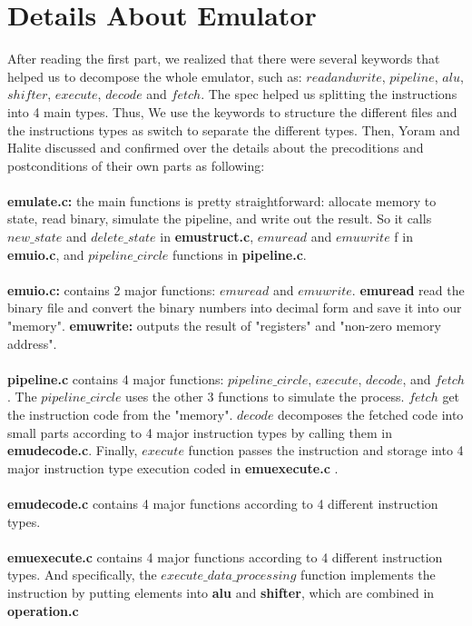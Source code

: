 \documentclass[a4paper]{article}
\begin{document}
\section{Details About Emulator}
After reading the first part, we realized that there were several keywords that helped us to decompose the whole emulator, such as: $read and write$, $pipeline$, $alu$, $shifter$, $execute$, $decode$ and $fetch$. The spec helped us splitting the instructions into 4 main types. Thus, We use the keywords to structure the different files and the instructions types as switch to separate the different types. Then, Yoram and Halite discussed and confirmed over the details about the precoditions and postconditions of their own parts as following:
\\\\
\textbf{emulate.c:} the main functions is pretty straightforward: allocate memory to state, read binary, simulate the pipeline, and write out the result. So it calls $new\_state$ and $delete\_state$ in \textbf{emustruct.c}, $emuread$ and $emuwrite$ f in \textbf{emuio.c}, and $pipeline\_circle$ functions in \textbf{pipeline.c}.
\\\\
\textbf{emuio.c:} contains 2 major functions: $emuread$ and $emuwrite$. \textbf{emuread} read the binary file and convert the binary numbers into decimal form and save it into our "memory".
\textbf{emuwrite:} outputs the result of "registers" and "non-zero memory address".
\\\\
\textbf{pipeline.c} contains 4 major functions: $pipeline\_circle$, $execute$, $decode$, and $fetch$. The $pipeline\_circle$ uses the other 3 functions to simulate the process. $fetch$ get the instruction code from the "memory". $decode$ decomposes the fetched code into small parts according to 4 major instruction types by calling them in \textbf{emudecode.c}. Finally, $execute$ function passes the instruction and storage into 4 major instruction type execution coded in \textbf{emuexecute.c} .
\\\\
\textbf{emudecode.c} contains 4 major functions according to 4 different instruction types.
\\\\
\textbf{emuexecute.c} contains 4 major functions according to 4 different instruction types. And specifically, the $execute\_data\_processing$ function implements the instruction by putting elements into \textbf{alu} and \textbf{shifter}, which are combined in \textbf{operation.c}\\
\end{document}
